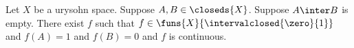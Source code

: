%                     



\begin{theorem}\label{urysohn}
    Let $X$ be a urysohn space.
    Suppose $A,B \in \closeds{X}$.
    Suppose $A \inter B$ is empty.
    There exist $f$ such that $f \in \funs{X}{\intervalclosed{\zero}{1}}$ 
    and $f(A) = 1$ and $f(B)= 0$ and $f$ is continuous.
\end{theorem}
